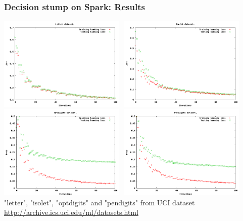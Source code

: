 \documentclass{beamer}
\begin{document}
\begin{frame}
\frametitle{Decision stump on Spark: Results}
\includegraphics[width=0.45\textwidth]{img/letter.png} \ 
\includegraphics[width=0.45\textwidth]{img/isolet.png} \\
\includegraphics[width=0.45\textwidth]{img/optdigits.png} \ 
\includegraphics[width=0.45\textwidth]{img/pendigits.png} \\
{ \footnotesize
    "letter", "isolet", "optdigits" and "pendigits" from UCI dataset \\
    \href{http://archive.ics.uci.edu/ml/datasets.html}{http://archive.ics.uci.edu/ml/datasets.html}
}
\end{frame}
\end{document}
